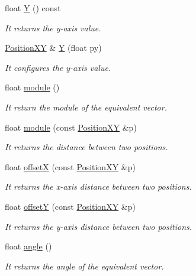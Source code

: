 \begin{DoxyCompactItemize}
float \hyperlink{class_position_x_y_aa6bceb45b13566b4a312d5d7aad2ec77}{Y} () const 
\begin{DoxyCompactList}\small\item\em It returns the y-\/axis value. \end{DoxyCompactList}\item 
\hyperlink{class_position_x_y}{Position\+X\+Y} \& \hyperlink{class_position_x_y_a7bb12f86083750580799fcf0535518e9}{Y} (float py)
\begin{DoxyCompactList}\small\item\em It configures the y-\/axis value. \end{DoxyCompactList}\item 
float \hyperlink{class_position_x_y_a2cb93c8c3b4632d7a2dd15b533c622b2}{module} ()
\begin{DoxyCompactList}\small\item\em It return the module of the equivalent vector. \end{DoxyCompactList}\item 
float \hyperlink{class_position_x_y_aef36d35ba710af6426600a6debc22e05}{module} (const \hyperlink{class_position_x_y}{Position\+X\+Y} \&p)
\begin{DoxyCompactList}\small\item\em It returns the distance between two positions. \end{DoxyCompactList}\item 
float \hyperlink{class_position_x_y_a4fdeadbb0bd6e3c62e1d1f0aea15f60e}{offset\+X} (const \hyperlink{class_position_x_y}{Position\+X\+Y} \&p)
\begin{DoxyCompactList}\small\item\em It returns the x-\/axis distance between two positions. \end{DoxyCompactList}\item 
float \hyperlink{class_position_x_y_aa67b14df525c7407063fa1a7fe631a26}{offset\+Y} (const \hyperlink{class_position_x_y}{Position\+X\+Y} \&p)
\begin{DoxyCompactList}\small\item\em It returns the y-\/axis distance between two positions. \end{DoxyCompactList}\item 
float \hyperlink{class_position_x_y_a116b177cc6d5f39d05ed72bfcbc5a235}{angle} ()
\begin{DoxyCompactList}\small\item\em It returns the angle of the equivalent vector. \end{DoxyCompactList}\item 

\end{DoxyCompactItemize}
